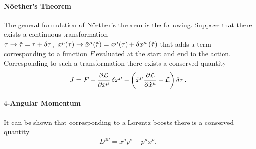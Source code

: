 \paragraph{Nöether's Theorem}
The general formulation of Nöether's theorem is the following: Suppose that there exists a continuous transformation $\tau \to \tilde{\tau} = \tau + \var{\tau},\ x^{\mu}(\tau) \to \tilde{x}^{\mu}(\tilde{\tau}) = x^{\mu}(\tau) + \var{x^{\mu}}(\tilde{\tau})$ that adds a term corresponding to a function $F$ evaluated at the start and end to the action. Corresponding to such a transformation there exists a conserved quantity
\begin{align*}
	J = F - \pdv{\ensuremath{\mathcal{L}}}{x^{\mu}}\var{x^{\mu}} + \left(\dot{x}^{\mu}\pdv{\ensuremath{\mathcal{L}}}{\dot{x}^{\mu}} - \mathcal{L}\right)\var{\tau}.
\end{align*}

\paragraph{$4$-Angular Momentum}
It can be shown that corresponding to a Lorentz boosts there is a conserved quantity
\begin{align*}
	L^{\mu\nu} = x^{\mu}p^{\nu} - p^{\mu}x^{\nu}.
\end{align*}